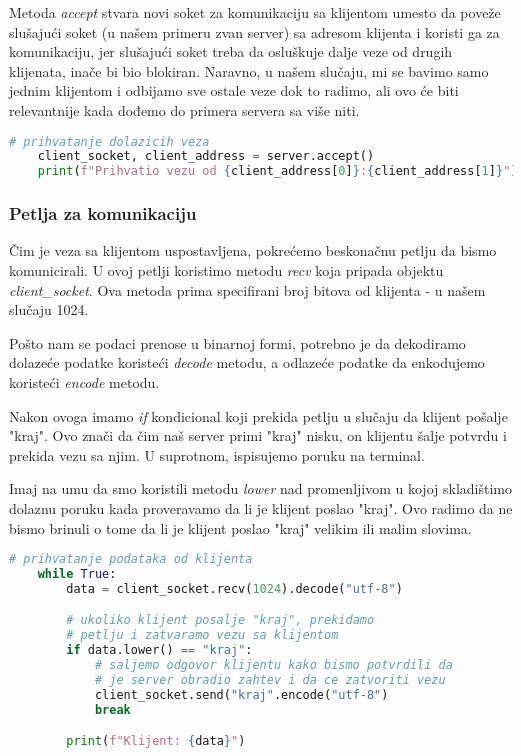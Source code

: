 Metoda \emph{accept} stvara novi soket za komunikaciju sa klijentom umesto da poveže slušajući soket (u našem primeru zvan server) sa adresom klijenta i koristi ga za komunikaciju, jer slušajući soket treba da osluškuje dalje veze od drugih klijenata, inače bi bio blokiran. Naravno, u našem slučaju, mi se bavimo samo jednim klijentom i odbijamo sve ostale veze dok to radimo, ali ovo će biti relevantnije kada dođemo do primera servera sa više niti.

\vspace{0.5cm}

\begin{lstlisting}[language = Python]
    # prihvatanje dolazicih veza
    client_socket, client_address = server.accept()
    print(f"Prihvatio vezu od {client_address[0]}:{client_address[1]}")
\end{lstlisting}

\subsubsection{Petlja za komunikaciju}

Čim je veza sa klijentom uspostavljena, pokrećemo beskonačnu petlju da bismo komunicirali. U ovoj petlji koristimo metodu \emph{recv} koja pripada objektu \emph{client\_socket}. Ova metoda prima specifirani broj bitova od klijenta - u našem slučaju 1024.

Pošto nam se podaci prenose u binarnoj formi, potrebno je da dekodiramo dolazeće podatke koristeći \emph{decode} metodu, a odlazeće podatke da enkodujemo koristeći \emph{encode} metodu.

Nakon ovoga imamo \emph{if} kondicional koji prekida petlju u slučaju da klijent pošalje "kraj". Ovo znači da čim naš server primi "kraj" nisku, on klijentu šalje potvrdu i prekida vezu sa njim. U suprotnom, ispisujemo poruku na terminal.

Imaj na umu da smo koristili metodu \emph{lower} nad promenljivom u kojoj skladištimo dolaznu poruku kada proveravamo da li je klijent poslao "kraj". Ovo radimo da ne bismo brinuli o tome da li je klijent poslao "kraj" velikim ili malim slovima.

\vspace{0.5cm}

\begin{lstlisting}[language = Python]
    # prihvatanje podataka od klijenta
    while True:
        data = client_socket.recv(1024).decode("utf-8")

        # ukoliko klijent posalje "kraj", prekidamo
        # petlju i zatvaramo vezu sa klijentom
        if data.lower() == "kraj":
            # saljemo odgovor klijentu kako bismo potvrdili da
            # je server obradio zahtev i da ce zatvoriti vezu
            client_socket.send("kraj".encode("utf-8")
            break

        print(f"Klijent: {data}")
\end{lstlisting}

